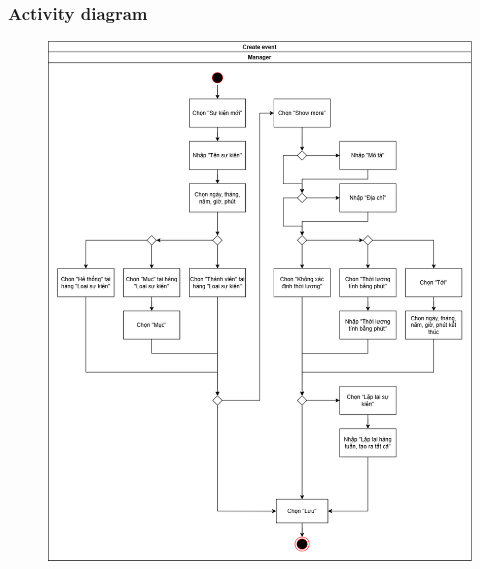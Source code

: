 \documentclass[a4paper, 12pt]{article}
\begin{document}
\subsubsection{Activity diagram}
\begin{figure}[H]
    \centering
    \includegraphics[height=0.5\textheight]{images/ce-action.drawio.png}
    \label{fig:enter-label}
\end{figure}
\end{document}
